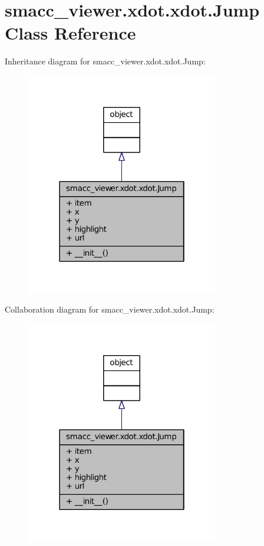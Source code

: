 \hypertarget{classsmacc__viewer_1_1xdot_1_1xdot_1_1Jump}{}\section{smacc\+\_\+viewer.\+xdot.\+xdot.\+Jump Class Reference}
\label{classsmacc__viewer_1_1xdot_1_1xdot_1_1Jump}


Inheritance diagram for smacc\+\_\+viewer.\+xdot.\+xdot.\+Jump\+:
\nopagebreak
\begin{figure}[H]
\begin{center}
\leavevmode
\includegraphics[width=238pt]{classsmacc__viewer_1_1xdot_1_1xdot_1_1Jump__inherit__graph}
\end{center}
\end{figure}


Collaboration diagram for smacc\+\_\+viewer.\+xdot.\+xdot.\+Jump\+:
\nopagebreak
\begin{figure}[H]
\begin{center}
\leavevmode
\includegraphics[width=238pt]{classsmacc__viewer_1_1xdot_1_1xdot_1_1Jump__coll__graph}
\end{center}
\end{figure}
